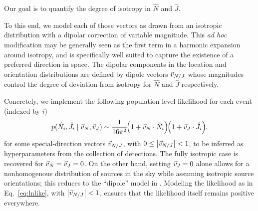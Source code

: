 \documentclass[twocolumn,twocolappendix,linenumbers]{aastex631}
\begin{document}
Our goal is to quantify the degree of isotropy in $\hat{N}$ and $\hat{J}$.

To this end, we model each of those vectors as drawn from an isotropic distribution with a dipolar correction of variable magnitude.
This \emph{ad hoc} modification may be generally seen as the first term in a harmonic expansion around isotropy, and is specifically well suited to capture the existence of a preferred direction in space.
The dipolar components in the location and orientation distributions are defined by dipole vectors $\vec{v}_{N/J}$ whose magnitudes control the degree of deviation from isotropy for $\hat{N}$ and $\hat{J}$ respectively. 

Concretely, we implement the following population-level likelihood for each event (indexed by $i$)
\begin{equation}
\label{eq:lnlike}
p(\hat{N}_i,\hat{J}_i \mid \dip{N}, \dip{J}) \sim \frac{1}{16 \pi^2}  \hspace{-3pt}\left(1 + \dip{N} \cdot \hat{N}_i\right) \hspace{-3pt} \left(1 + \dip{J} \cdot \hat{J}_i\right) \hspace{-2pt} ,
\end{equation}
for some special-direction vectors $\vec{v}_{N/J}$, with $0 \leq \left| \vec{v}_{N/J} \right| < 1$, to be inferred as hyperparameters from the collection of detections.
The fully isotropic case is recovered for $\vec{v}_{N} = \vec{v}_{J} = 0$.
On the other hand, setting $\vec{v}_{J} = 0$ alone allows for a nonhomogenous distribution of sources in the sky while assuming isotropic source orientations; this reduces to the ``dipole'' model in \citet{Essick:2022slj}.
Modeling the likelihood as in Eq.~\eqref{eq:lnlike}, with $\left| \vec{v}_{N/J} \right| < 1$, ensures that the likelihood itself remains positive everywhere.
\end{document}
